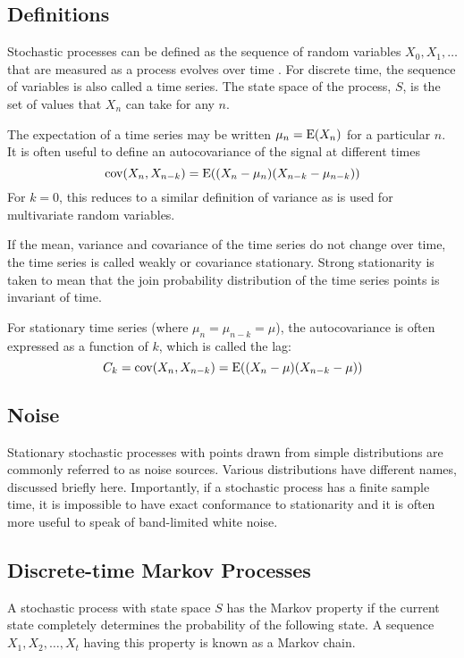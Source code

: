 \subsection{Definitions}
Stochastic processes can be defined as the sequence of random variables ${X_0, X_1,\dots}$ that are measured as a process evolves over time \citep[107]{kulkarni1999modeling}.
For discrete time, the sequence of variables is also called a time series.
The state space of the process, $S$, is the set of values that $X_n$ can take for any $n$.

The expectation of a time series may be written $\mu_n = \mathrm{E}(X_n)$ for a particular $n$.
It is often useful to define an autocovariance of the signal at different times \citep[21]{kitagawa2009introduction}
\begin{equation}
  \label{eq:autocovariance}
  \textrm{cov}(X_n,X_{n-k}) = \mathrm{E}((X_n-\mu_n)(X_{n-k} - \mu_{n-k}))
\end{equation}
For $k=0$, this reduces to a similar definition of variance as is used for multivariate random variables.

If the mean, variance and covariance of the time series do not change over time, the time series is called weakly or covariance stationary.
Strong stationarity is taken to mean that the join probability distribution of the time series points is invariant of time.~\citep[20]{kitagawa2009introduction}

For stationary time series (where $\mu_n = \mu_{n-k} = \mu$), the autocovariance is often expressed as a function of $k$, which is called the lag:
\begin{equation}
  \label{eq:autocovariance}
  C_k = \textrm{cov}(X_n, X_{n-k}) = \mathrm{E}((X_n-\mu)(X_{n-k}-\mu))
\end{equation}

\subsection{Noise}
Stationary stochastic processes with points drawn from simple distributions are commonly referred to as noise sources.
Various distributions have different names, discussed briefly here.
Importantly, if a stochastic process has a finite sample time, it is impossible to have exact conformance to stationarity and it is often more useful to speak of band-limited white noise.

\subsection{Discrete-time Markov Processes}
A stochastic process with state space $S$ has the Markov property if the current state completely determines the probability of the following state.
A sequence $X_1,X_2, \dots ,X_t$ having this property is known as a Markov chain.

